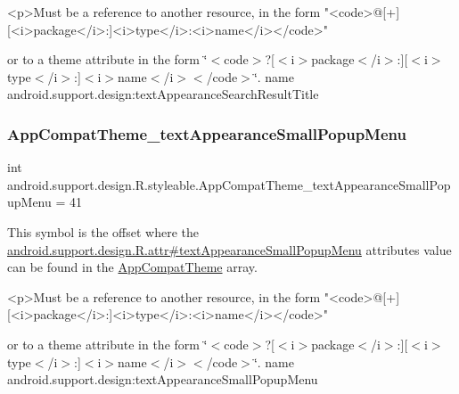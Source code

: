 \begin{DoxyVerb}      <p>Must be a reference to another resource, in the form "<code>@[+][<i>package</i>:]<i>type</i>:<i>name</i></code>"
\end{DoxyVerb}
 or to a theme attribute in the form \char`\"{}$<$code$>$?\mbox{[}$<$i$>$package$<$/i$>$\+:\mbox{]}\mbox{[}$<$i$>$type$<$/i$>$\+:\mbox{]}$<$i$>$name$<$/i$>$$<$/code$>$\char`\"{}.  name android.\+support.\+design\+:text\+Appearance\+Search\+Result\+Title \mbox{\label{classandroid_1_1support_1_1design_1_1R_1_1styleable_a244ffcdac7c8cd9bada32939947ccf3d}} 
\subsubsection{\texorpdfstring{App\+Compat\+Theme\+\_\+text\+Appearance\+Small\+Popup\+Menu}{AppCompatTheme\_textAppearanceSmallPopupMenu}}
{\footnotesize\ttfamily int android.\+support.\+design.\+R.\+styleable.\+App\+Compat\+Theme\+\_\+text\+Appearance\+Small\+Popup\+Menu = 41\hspace{0.3cm}{\ttfamily [static]}}

This symbol is the offset where the \hyperlink{classandroid_1_1support_1_1design_1_1R_1_1attr_a149652ce8ee803d221fe3d2d84235adc}{android.\+support.\+design.\+R.\+attr\#text\+Appearance\+Small\+Popup\+Menu} attribute\textquotesingle{}s value can be found in the \hyperlink{classandroid_1_1support_1_1design_1_1R_1_1styleable_afb351dc8de20cbd4c89abe360373010c}{App\+Compat\+Theme} array.

\begin{DoxyVerb}      <p>Must be a reference to another resource, in the form "<code>@[+][<i>package</i>:]<i>type</i>:<i>name</i></code>"
\end{DoxyVerb}
 or to a theme attribute in the form \char`\"{}$<$code$>$?\mbox{[}$<$i$>$package$<$/i$>$\+:\mbox{]}\mbox{[}$<$i$>$type$<$/i$>$\+:\mbox{]}$<$i$>$name$<$/i$>$$<$/code$>$\char`\"{}.  name android.\+support.\+design\+:text\+Appearance\+Small\+Popup\+Menu \mbox{\label{classandroid_1_1support_1_1design_1_1R_1_1styleable_abc7c2b20a8ab2fd4ce11d97bc2dcf36e}} 
